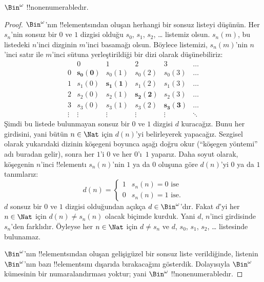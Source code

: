 \documentclass[../../../include/open-logic-section]{subfiles}
\begin{document}
\begin{thm}
$\Bin^\omega$ !!{nonenumerable}{}dır.
\end{thm}

\begin{proof}
$\Bin^\omega$'nın !!{element}s{}ından oluşan herhangi bir sonsuz listeyi düşünün.
Her $s_n$'nin sonsuz bir $0$ ve $1$ dizgisi olduğu $s_0$, $s_1$, $s_2$,
\dots{} listemiz olsun. $s_n(m)$, bu listedeki $n$'inci dizginin $m$'inci
basamağı olsun. Böylece listemizi, $s_n(m)$'nin $n$'inci satır ile $m$'inci
sütuna yerleştirildiği bir dizi olarak düşünebiliriz:
\[
\begin{array}{c|c|c|c|c|c}
& 0 & 1 & 2 & 3 & \dots \\\hline
0 & \mathbf{s_{0}(0)} & s_{0}(1) & s_{0}(2) & s_0(3) & \dots \\\hline
1 & s_{1}(0)& \mathbf{s_{1}(1)} & s_1(2) & s_1(3) & \dots \\\hline
2 & s_{2}(0)& s_{2}(1) & \mathbf{s_2(2)} & s_2(3) & \dots \\\hline
3 & s_{3}(0)& s_{3}(1) & s_3(2) & \mathbf{s_3(3)} & \dots \\\hline
\vdots & \vdots & \vdots & \vdots & \vdots & \mathbf{\ddots}
\end{array}
\]
Şimdi bu listede bulunmayan sonsuz bir $0$ ve $1$ dizgisi $d$ kuracağız.
Bunu her girdisini, yani bütün $n\in\Nat$ için $d(n)$'yi belirleyerek
yapacağız. Sezgisel olarak yukarıdaki dizinin köşegeni boyunca aşağı doğru
okur (``köşegen yöntemi'' adı buradan gelir), sonra her $1$'i $0$ ve her
$0$'ı~$1$ yaparız. Daha soyut olarak, köşegenin $n$'inci !!{element}{}ı
$s_n(n)$'nin $1$ ya da $0$ oluşuna göre $d(n)$'yi $0$ ya da $1$ tanımlarız:
\[
d(n) =
\begin{cases}
1 & \text{$s_{n}(n) = 0$ ise}\\
0 & \text{$s_{n}(n) = 1$ ise.}
\end{cases}
\]
$d$ sonsuz bir $0$ ve $1$ dizgisi olduğundan açıkça $d\in\Bin^\omega$'dır.
Fakat $d$'yi her $n\in\Nat$ için $d(n)\neq s_n(n)$ olacak biçimde kurduk.
Yani $d$, $n$'inci girdisinde $s_n$'den farklıdır. Öyleyse her
$n\in\Nat$ için $d\neq s_n$ ve $d$, $s_0$, $s_1$, $s_2$, \dots{} listesinde
bulunamaz.

$\Bin^\omega$'nın !!{element}s{}ından oluşan gelişigüzel bir sonsuz liste
verildiğinde, listenin $\Bin^\omega$'nın bazı !!{element}s{}ını
dışarıda bırakacağını gösterdik. Dolayısıyla $\Bin^\omega$ kümesinin bir
numaralandırması yoktur; yani $\Bin^\omega$ !!{nonenumerable}{}dır.
\end{proof}
\end{document}
